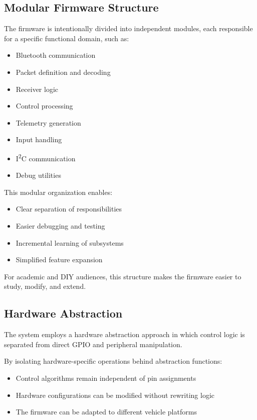\subsection{Modular Firmware Structure}

The firmware is intentionally divided into independent modules, each responsible for a specific functional domain, such as:

\begin{itemize}
	\item Bluetooth communication
	\item Packet definition and decoding
	\item Receiver logic
	\item Control processing
	\item Telemetry generation
	\item Input handling
	\item I\textsuperscript{2}C communication
	\item Debug utilities
\end{itemize}

This modular organization enables:

\begin{itemize}
	\item Clear separation of responsibilities
	\item Easier debugging and testing
	\item Incremental learning of subsystems
	\item Simplified feature expansion
\end{itemize}

For academic and DIY audiences, this structure makes the firmware easier to study, modify, and extend.

\subsection{Hardware Abstraction}

The system employs a hardware abstraction approach in which control logic is separated from direct GPIO and peripheral manipulation.

By isolating hardware-specific operations behind abstraction functions:

\begin{itemize}
	\item Control algorithms remain independent of pin assignments
	\item Hardware configurations can be modified without rewriting logic
	\item The firmware can be adapted to different vehicle platforms
\end{itemize}

